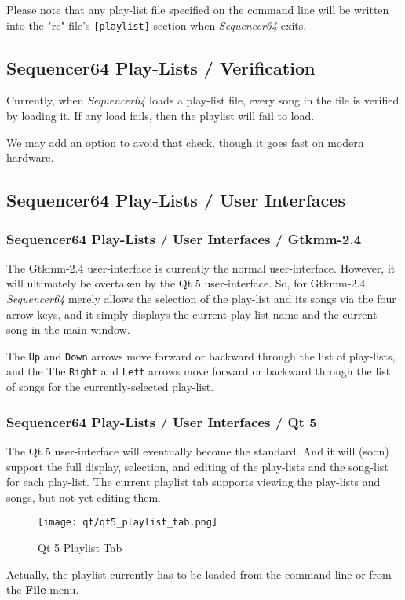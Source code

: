   Please note that any play-list file specified on the command line
   will be written into the "rc" file's \texttt{[playlist]} section when
   \textsl{Sequencer64} exits.

\subsection{Sequencer64 Play-Lists / Verification}
\label{subsec:playlist_verify}

   Currently, when \textsl{Sequencer64} loads a play-list file, every
   song in the file is verified by loading it.  If any load fails, then
   the playlist will fail to load.

   We may add an option to avoid that check, though it goes fast on
   modern hardware.

\subsection{Sequencer64 Play-Lists / User Interfaces}
\label{subsec:playlist_uis}

\subsubsection{Sequencer64 Play-Lists / User Interfaces / Gtkmm-2.4}
\label{subsubsec:playlist_ui_gtk}

   The Gtkmm-2.4 user-interface is currently the normal user-interface.
   However, it will ultimately be overtaken by the Qt 5 user-interface.
   So, for Gtkmm-2.4, \textsl{Sequencer64} merely allows the selection of the
   play-list and its songs via the four arrow keys, and it simply displays the
   current play-list name and the current song in the main window.

   The \texttt{Up} and \texttt{Down} arrows move forward or backward through
   the list of play-lists, and the
   The \texttt{Right} and \texttt{Left} arrows move forward or backward through
   the list of songs for the currently-selected play-list.

\subsubsection{Sequencer64 Play-Lists / User Interfaces / Qt 5}
\label{subsubsec:playlist_ui_qt}

   The Qt 5 user-interface will eventually become the standard.
   And it will (soon) support the full display, selection, and editing of the
   play-lists and the song-list for each play-list.
   The current playlist tab supports viewing the play-lists and songs, but not
   yet editing them.

\begin{figure}[H]
   \centering 
   \texttt{[image: qt/qt5\_playlist\_tab.png]}
   \caption*{Qt 5 Playlist Tab}
\end{figure}

   Actually, the playlist currently has to be loaded from the command line or
   from the \textbf{File} menu.

